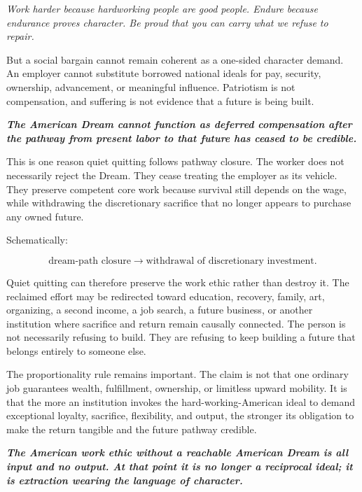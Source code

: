 \documentclass[11pt,oneside]{article}
\renewenvironment{quote}
  {\begin{tcolorbox}[
      enhanced,
      breakable,
      colback=ManifestLight,
      colframe=ManifestRule,
      boxrule=0pt,
      leftrule=3pt,
      arc=0pt,
      outer arc=0pt,
      left=10pt,right=10pt,top=8pt,bottom=8pt,
      before skip=0.8em,after skip=0.8em
    ]\itshape}
  {\end{tcolorbox}}
\begin{document}
\begin{quote}
Work harder because hardworking people are good people. Endure because
endurance proves character. Be proud that you can carry what we refuse
to repair.
\end{quote}

But a social bargain cannot remain coherent as a one-sided character
demand. An employer cannot substitute borrowed national ideals for pay,
security, ownership, advancement, or meaningful influence. Patriotism is
not compensation, and suffering is not evidence that a future is being
built.

\begin{quote}
\textbf{The American Dream cannot function as deferred compensation
after the pathway from present labor to that future has ceased to be
credible.}
\end{quote}

This is one reason quiet quitting follows pathway closure. The worker
does not necessarily reject the Dream. They cease treating the employer
as its vehicle. They preserve competent core work because survival still
depends on the wage, while withdrawing the discretionary sacrifice that
no longer appears to purchase any owned future.

Schematically:

\[
\text{dream-path closure}
\longrightarrow
\text{withdrawal of discretionary investment}.
\]

Quiet quitting can therefore preserve the work ethic rather than destroy
it. The reclaimed effort may be redirected toward education, recovery,
family, art, organizing, a second income, a job search, a future
business, or another institution where sacrifice and return remain
causally connected. The person is not necessarily refusing to build.
They are refusing to keep building a future that belongs entirely to
someone else.

The proportionality rule remains important. The claim is not that one
ordinary job guarantees wealth, fulfillment, ownership, or limitless
upward mobility. It is that the more an institution invokes the
hard-working-American ideal to demand exceptional loyalty, sacrifice,
flexibility, and output, the stronger its obligation to make the return
tangible and the future pathway credible.

\begin{quote}
\textbf{The American work ethic without a reachable American Dream is
all input and no output. At that point it is no longer a reciprocal
ideal; it is extraction wearing the language of character.}
\end{quote}
\end{document}
